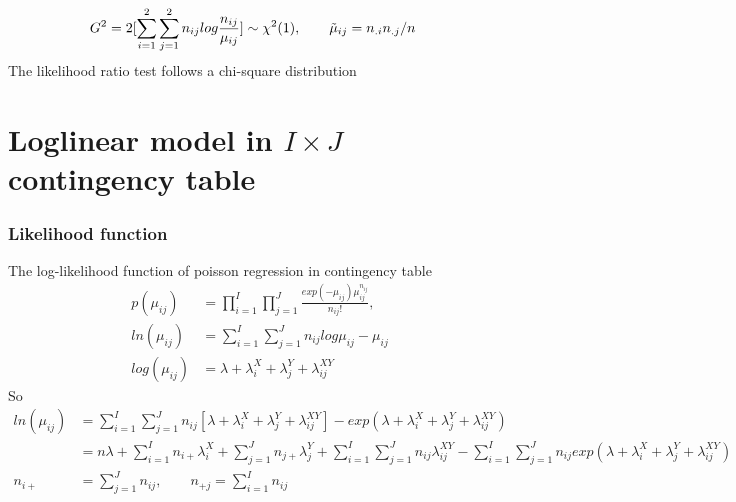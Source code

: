 \documentclass[11pt]{article} %
\begin{document}
\begin{align*}
G^2 &= 2[\sum_{i=1}^2 \sum_{j=1}^2 n_{ij} log \frac{n_{ij}}{\mu_{ij}}] \sim \chi^2(1), \qquad \Tilde{\mu}_{ij} = n_{.i}n_{.j}/n
\end{align*}
The likelihood ratio test follows a chi-square distribution 

\section{Loglinear model in $I \times J$ contingency table}

 \subsubsection{Likelihood function} 
The log-likelihood function of poisson regression in contingency table
\begin{align*}
	p(\mu_{ij}) &= \prod_{i=1}^I \prod_{j=1}^J \frac{exp(-\mu_{ij}) \mu_{ij}^{n_{ij}}}{n_{ij}!},  \\
	ln(\mu_{ij}) & = \sum_{i=1}^I  \sum_{j=1}^J n_{ij} log \mu_{ij} - \mu_{ij}\\
	 log(\mu_{ij}) &= \lambda + \lambda_i^X + \lambda_j^Y + \lambda_{ij}^{XY}
\end{align*}
So 
\begin{align*}
	ln(\mu_{ij}) & = \sum_{i=1}^I  \sum_{j=1}^J n_{ij} [ \lambda + \lambda_i^X + \lambda_j^Y + \lambda_{ij}^{XY}] - exp( \lambda + \lambda_i^X + \lambda_j^Y + \lambda_{ij}^{XY})\\
&= n \lambda + \sum_{i=1}^I n_{i+} \lambda_i^X + \sum_{j=1}^J n_{j+} \lambda_j^Y +  \sum_{i=1}^I \sum_{j=1}^J  n_{ij} \lambda_{ij}^{XY} -  \sum_{i=1}^I \sum_{j=1}^J  n_{ij} exp( \lambda + \lambda_i^X + \lambda_j^Y + \lambda_{ij}^{XY})\\
n_{i+} &=  \sum_{j=1}^J n_{ij}, \qquad n_{+j} =  \sum_{i=1}^I n_{ij}
\end{align*}
\end{document}
